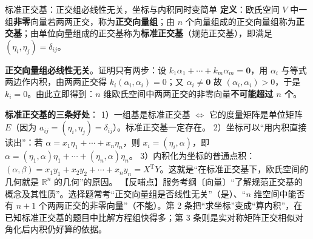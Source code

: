 \begin{fdeep}{标准正交基：正交组必线性无关，坐标与内积同时变简单}
\textbf{定义}：欧氏空间 $V$ 中一组\textbf{非零}向量若两两正交，称为\textbf{正交向量组}；由 $n$ 个向量组成的正交向量组称为\textbf{正交基}；由单位向量组成的正交基称为\textbf{标准正交基}（规范正交基），即满足 $(\eta_i,\eta_j)=\delta_{ij}$。

\textbf{正交向量组必线性无关}。证明只有两步：设 $k_1\alpha_1+\cdots+k_m\alpha_m=\mathbf{0}$，用 $\alpha_i$ 与等式两边作内积，由两两正交得 $k_i(\alpha_i,\alpha_i)=0$；又 $\alpha_i\ne\mathbf{0}$ 故 $(\alpha_i,\alpha_i)>0$，于是 $k_i=0$。由此立即得到：$n$ 维欧氏空间中两两正交的非零向量\textbf{不可能超过 $n$ 个}。

\textbf{标准正交基的三条好处}：
1）一组基是标准正交基 $\iff$ 它的度量矩阵是单位矩阵 $E$（因为 $a_{ij}=(\eta_i,\eta_j)=\delta_{ij}$）。标准正交基一定存在。
2）坐标可以“用内积直接读出”：若 $\alpha=x_1\eta_1+\cdots+x_n\eta_n$，则 $x_i=(\eta_i,\alpha)$，即 $\alpha=(\eta_1,\alpha)\eta_1+\cdots+(\eta_n,\alpha)\eta_n$。
3）内积化为坐标的普通点积：$(\alpha,\beta)=x_1y_1+x_2y_2+\cdots+x_ny_n=X^{\mathrm T}Y$。这就是“在标准正交基下，欧氏空间的几何就是 $\mathbb{R}^n$ 的几何”的原因。
【反哺点】服务考纲〔向量〕“了解规范正交基的概念及其性质”。选择题常考“正交向量组是否线性无关”（是）、“$n$ 维空间中能否有 $n+1$ 个两两正交的非零向量”（不能）。第 2 条把“求坐标”变成“算内积”，在已知标准正交基的题目中比解方程组快得多；第 3 条则是实对称矩阵正交相似对角化后内积仍好算的依据。
\end{fdeep}

